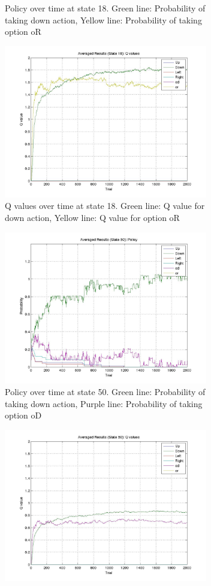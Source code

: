 \documentclass{acm_proc_article-sp}
\begin{document}
\begin{figure}[!htbp]
\begin{subfigure}[h]{.45\textwidth}
    \caption{Policy over time at state 18. Green line: Probability of taking down action, Yellow line: Probability of taking option oR}
  \end{subfigure}
  \hfill
  \begin{subfigure}[h]{.45\textwidth}
  \centering
    \includegraphics[width=3.5in]{Q18.jpeg}
    \caption{Q values over time at state 18. Green line: Q value for down action, Yellow line: Q value for option oR}
  \end{subfigure}
    \hfill
  \begin{subfigure}[h]{.45\textwidth}
  \centering
    \includegraphics[width=3.5in]{pol50.jpeg}
    \caption{Policy over time at state 50. Green line: Probability of taking down action, Purple line: Probability of taking option oD}
  \end{subfigure}
    \hfill
  \begin{subfigure}[h]{.45\textwidth}
  \centering
    \includegraphics[width=3.5in]{Q50.jpeg}

\end{subfigure}
\end{figure}
\end{document}
